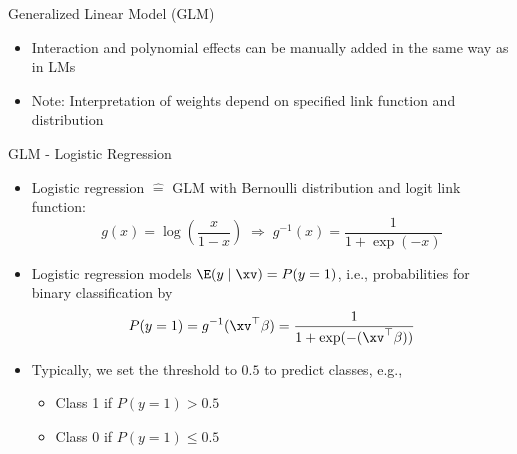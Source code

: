 \documentclass[11pt,compress,t,notes=noshow, aspectratio=169, xcolor=table]{beamer}
\begin{document}
\begin{frame}{Generalized Linear Model (GLM)}
\begin{itemize}[<+->]
        \item Interaction and polynomial effects can be manually added in the same way as in LMs
        \item Note: Interpretation of weights depend on specified link function and distribution
    \end{itemize}
\end{frame}
 	
\begin{frame}{GLM - Logistic Regression}
\begin{itemize}
    \item Logistic regression $\hat{=}$ GLM with Bernoulli distribution and logit link function: 
    $$g(x) = \log\left(\frac{x}{1 - x}\right) \; \Rightarrow \; g^{-1}(x) = \frac{1}{1+\exp(-x)} $$
    \item Logistic regression models $\E(y \mid \xv) = P(y = 1)$, i.e., probabilities for binary classification by
    $$P(y = 1) = g^{-1}(\xv^\top \beta) = \frac{1}{1 + \exp(-( \xv^\top \beta ))} $$
    \item Typically, we set the threshold to $0.5$ to predict classes, e.g.,
        \begin{itemize}
            \item Class 1 if $P(y=1) > 0.5$
            \item Class 0 if $P(y=1) \leq 0.5$
        \end{itemize}
\end{itemize}
\end{frame}
\end{document}
